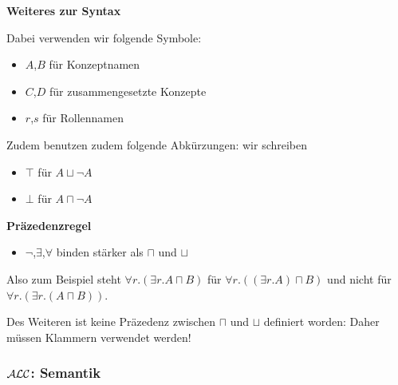 \textbf{Weiteres zur Syntax}

Dabei verwenden wir folgende Symbole:

\begin{itemize}
  \item $A$,$B$ für Konzeptnamen
  \item $C$,$D$ für zusammengesetzte Konzepte
  \item $r$,$s$ für Rollennamen
\end{itemize}

Zudem benutzen zudem folgende Abkürzungen: wir schreiben

\begin{itemize}
  \item $\top$ für $A \sqcup \neg A$
  \item $\bot$ für $A \sqcap \neg A$
\end{itemize}

\textbf{Präzedenzregel}

\begin{itemize}
  \item{$\neg$,$\exists$,$\forall$ binden stärker als $\sqcap$ und $\sqcup$}
\end{itemize}

Also zum Beispiel steht $\forall r.(\exists r.A \sqcap B)$ für $\forall r.((\exists r.A) \sqcap B)$ und nicht für $\forall r.(\exists r.(A \sqcap B))$.

Des Weiteren ist keine Präzedenz zwischen $\sqcap$ und $\sqcup$ definiert worden: Daher müssen Klammern verwendet werden!

\subsubsection{\texorpdfstring{$\mathcal{A}\mathcal{L}\mathcal{C}$}{ALC}: Semantik}

